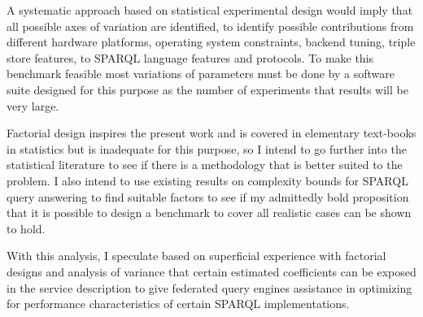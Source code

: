 \documentclass{llncs}
\begin{document}
A systematic approach based on statistical experimental design would
imply that all possible axes of variation are identified, to identify
possible contributions from different hardware platforms, operating
system constraints, backend tuning, triple store features, to SPARQL
language features and protocols. To make this benchmark feasible most
variations of parameters must be done by a software suite designed for
this purpose as the number of experiments that results will be very
large.

Factorial design inspires the present work and is covered in
elementary text-books in statistics but is inadequate for this
purpose, so I intend to go further into the statistical literature to
see if there is a methodology that is better suited to the
problem. I also intend to use existing results on complexity bounds
for SPARQL query answering to find suitable factors to see if my
admittedly bold proposition that it is possible to design a benchmark
to cover all realistic cases can be shown to hold.

With this analysis, I speculate based on superficial experience with
factorial designs and analysis of variance that certain estimated
coefficients can be exposed in the service description to give
federated query engines assistance in optimizing for performance
characteristics of certain SPARQL implementations. 





%
%
%

\end{document}
